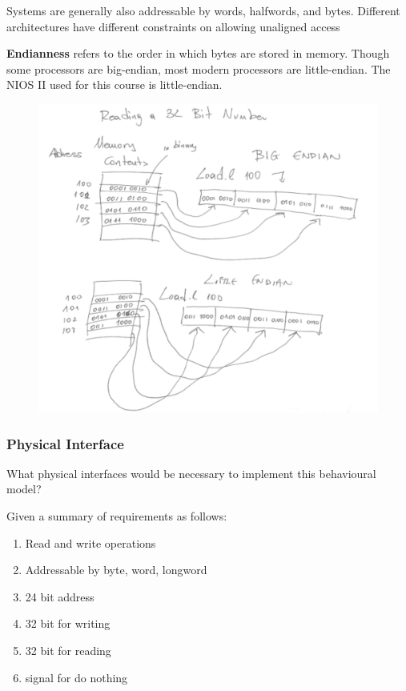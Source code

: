 \documentclass[../notes.tex]{subfiles}
\begin{document}
Systems are generally also addressable by words, halfwords, and bytes.
Different architectures have different constraints on allowing unaligned access

\textbf{Endianness} refers to the order in which bytes are stored in memory. Though some processors are big-endian, most modern processors are little-endian. The NIOS II used for this course is little-endian. 

\begin{figure}[H]
	\centering
	\includegraphics[width=0.8\linewidth]{img/image_2022-09-16-02-16-30.png}
\end{figure}

\subsubsection{Physical Interface}

What physical interfaces would be necessary to implement this behavioural model? 

Given a summary of requirements as follows:

\begin{enumerate}
	\item Read and write operations
	\item Addressable by byte, word, longword
	\item 24 bit address
	\item 32 bit for writing
	\item 32 bit for reading
	\item signal for do nothing
\end{enumerate}
\end{document}
